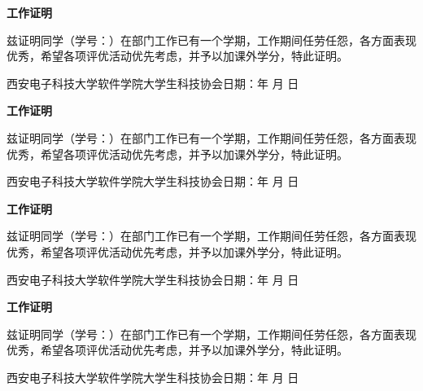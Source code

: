 \documentclass[UTF8]{ctexart}
\renewcommand{\today}{\number\year 年 \number\month 月 \number\day 日}
\begin{document}
\thispagestyle{empty}
\begin{center}
  \textbf{\Huge 工作证明}
\end{center}

\qquad 兹证明\phantom{同学姓名}同学（学号：\phantom{14130000000AB}）在\phantom{所在部门的名称}部门工作已有一个学期，工作期间任劳任怨，各方面表现优秀，希望各项评优活动优先考虑，并予以加课外学分，特此证明。
\begin{flushright}
  西安电子科技大学软件学院大学生科技协会\quad 日期：\today \\
\end{flushright}
\vspace{3cm}

\begin{center}
  \textbf{\Huge 工作证明}
\end{center}

\qquad 兹证明\phantom{同学姓名}同学（学号：\phantom{14130000000AB}）在\phantom{所在部门的名称}部门工作已有一个学期，工作期间任劳任怨，各方面表现优秀，希望各项评优活动优先考虑，并予以加课外学分，特此证明。
\begin{flushright}
  西安电子科技大学软件学院大学生科技协会\quad 日期：\today \\
\end{flushright}
\vspace{3cm}
\begin{center}
  \textbf{\Huge 工作证明}
\end{center}

\qquad 兹证明\phantom{同学姓名}同学（学号：\phantom{14130000000AB}）在\phantom{所在部门的名称}部门工作已有一个学期，工作期间任劳任怨，各方面表现优秀，希望各项评优活动优先考虑，并予以加课外学分，特此证明。
\begin{flushright}
  西安电子科技大学软件学院大学生科技协会\quad 日期：\today \\
\end{flushright}
\vspace{3cm}
\begin{center}
  \textbf{\Huge 工作证明}
\end{center}

\qquad 兹证明\phantom{同学姓名}同学（学号：\phantom{14130000000AB}）在\phantom{所在部门的名称}部门工作已有一个学期，工作期间任劳任怨，各方面表现优秀，希望各项评优活动优先考虑，并予以加课外学分，特此证明。
\begin{flushright}
  西安电子科技大学软件学院大学生科技协会\quad 日期：\today \\
\end{flushright}
\end{document}
